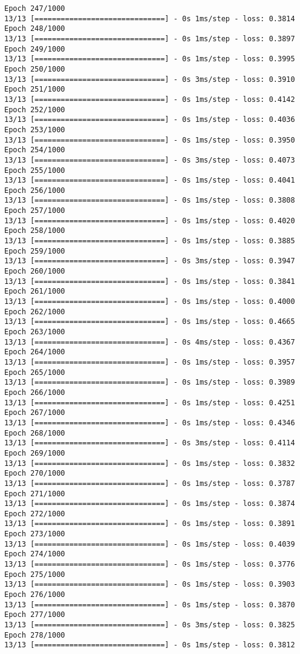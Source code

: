 \documentclass[11pt]{article}
\begin{document}
\begin{Verbatim}[commandchars=\\\{\}]
Epoch 247/1000
13/13 [==============================] - 0s 1ms/step - loss: 0.3814
Epoch 248/1000
13/13 [==============================] - 0s 1ms/step - loss: 0.3897
Epoch 249/1000
13/13 [==============================] - 0s 1ms/step - loss: 0.3995
Epoch 250/1000
13/13 [==============================] - 0s 3ms/step - loss: 0.3910
Epoch 251/1000
13/13 [==============================] - 0s 1ms/step - loss: 0.4142
Epoch 252/1000
13/13 [==============================] - 0s 1ms/step - loss: 0.4036
Epoch 253/1000
13/13 [==============================] - 0s 1ms/step - loss: 0.3950
Epoch 254/1000
13/13 [==============================] - 0s 3ms/step - loss: 0.4073
Epoch 255/1000
13/13 [==============================] - 0s 1ms/step - loss: 0.4041
Epoch 256/1000
13/13 [==============================] - 0s 1ms/step - loss: 0.3808
Epoch 257/1000
13/13 [==============================] - 0s 1ms/step - loss: 0.4020
Epoch 258/1000
13/13 [==============================] - 0s 1ms/step - loss: 0.3885
Epoch 259/1000
13/13 [==============================] - 0s 3ms/step - loss: 0.3947
Epoch 260/1000
13/13 [==============================] - 0s 1ms/step - loss: 0.3841
Epoch 261/1000
13/13 [==============================] - 0s 1ms/step - loss: 0.4000
Epoch 262/1000
13/13 [==============================] - 0s 1ms/step - loss: 0.4665
Epoch 263/1000
13/13 [==============================] - 0s 4ms/step - loss: 0.4367
Epoch 264/1000
13/13 [==============================] - 0s 1ms/step - loss: 0.3957
Epoch 265/1000
13/13 [==============================] - 0s 1ms/step - loss: 0.3989
Epoch 266/1000
13/13 [==============================] - 0s 1ms/step - loss: 0.4251
Epoch 267/1000
13/13 [==============================] - 0s 1ms/step - loss: 0.4346
Epoch 268/1000
13/13 [==============================] - 0s 3ms/step - loss: 0.4114
Epoch 269/1000
13/13 [==============================] - 0s 1ms/step - loss: 0.3832
Epoch 270/1000
13/13 [==============================] - 0s 1ms/step - loss: 0.3787
Epoch 271/1000
13/13 [==============================] - 0s 1ms/step - loss: 0.3874
Epoch 272/1000
13/13 [==============================] - 0s 1ms/step - loss: 0.3891
Epoch 273/1000
13/13 [==============================] - 0s 1ms/step - loss: 0.4039
Epoch 274/1000
13/13 [==============================] - 0s 1ms/step - loss: 0.3776
Epoch 275/1000
13/13 [==============================] - 0s 1ms/step - loss: 0.3903
Epoch 276/1000
13/13 [==============================] - 0s 1ms/step - loss: 0.3870
Epoch 277/1000
13/13 [==============================] - 0s 3ms/step - loss: 0.3825
Epoch 278/1000
13/13 [==============================] - 0s 1ms/step - loss: 0.3812

\end{Verbatim}
\end{document}
